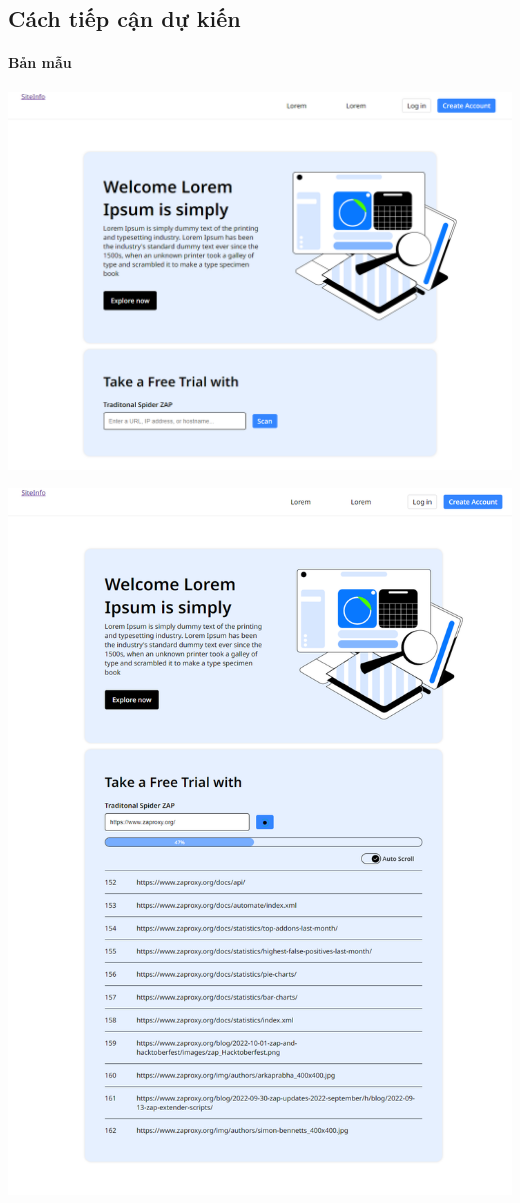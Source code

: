 \subsection{Cách tiếp cận dự kiến}
\paragraph{Bản mẫu}
\vspace{0.2\textheight}
\includegraphics[width=\textwidth]{images/prototype/prototype_25102022/home.png}

\includegraphics[width=\textwidth]{images/prototype/prototype_25102022/home_scanning.png}

